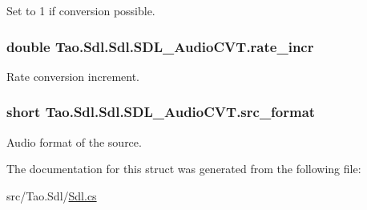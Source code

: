 Set to 1 if conversion possible. 

\hypertarget{struct_tao_1_1_sdl_1_1_sdl_1_1_s_d_l___audio_c_v_t_af40b193d1692d8530fbb6493516f3b6d}{
\subsubsection[{rate\_\-incr}]{\setlength{\rightskip}{0pt plus 5cm}double {\bf Tao.Sdl.Sdl.SDL\_\-AudioCVT.rate\_\-incr}}}
\label{struct_tao_1_1_sdl_1_1_sdl_1_1_s_d_l___audio_c_v_t_af40b193d1692d8530fbb6493516f3b6d}


Rate conversion increment. 

\hypertarget{struct_tao_1_1_sdl_1_1_sdl_1_1_s_d_l___audio_c_v_t_ad28834c5978683aa99aacc462354922b}{
\subsubsection[{src\_\-format}]{\setlength{\rightskip}{0pt plus 5cm}short {\bf Tao.Sdl.Sdl.SDL\_\-AudioCVT.src\_\-format}}}
\label{struct_tao_1_1_sdl_1_1_sdl_1_1_s_d_l___audio_c_v_t_ad28834c5978683aa99aacc462354922b}


Audio format of the source. 



The documentation for this struct was generated from the following file:\begin{DoxyCompactItemize}
\item 
src/Tao.Sdl/\hyperlink{_sdl_8cs}{Sdl.cs}\end{DoxyCompactItemize}
